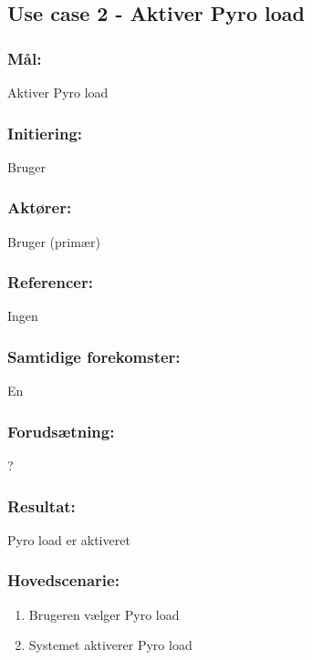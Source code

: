 \clearpage

\begin{framed}
	\subsection{Use case 2 - Aktiver Pyro load}
	
	\subsubsection*{Mål:}
	Aktiver Pyro load
	
	\subsubsection*{Initiering:}
	Bruger
	
	\subsubsection*{Aktører:}
	Bruger (primær)\\ \noindent
	
	\subsubsection*{Referencer:}
	Ingen
	
	\subsubsection*{Samtidige forekomster:}
	En
	
	\subsubsection*{Forudsætning:}
	?
	
	\subsubsection*{Resultat:}
	Pyro load er aktiveret
	
	\subsubsection*{Hovedscenarie:}
	\begin{enumerate}
		\item Brugeren vælger Pyro load
		\item Systemet aktiverer Pyro load
	\end{enumerate}

\end{framed}

